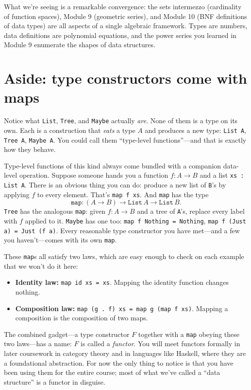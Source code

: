 \documentclass[11pt]{article}
\begin{document}
What we're seeing is a remarkable convergence: the sets intermezzo (cardinality of function spaces), Module 9 (geometric series), and Module 10 (BNF definitions of data types) are all aspects of a single algebraic framework. Types are numbers, data definitions are polynomial equations, and the power series you learned in Module 9 enumerate the shapes of data structures.

\section{Aside: type constructors come with maps}

Notice what \texttt{List}, \texttt{Tree}, and \texttt{Maybe} actually \emph{are}. None of them is a type on its own. Each is a construction that \emph{eats} a type $A$ and produces a new type: \texttt{List A}, \texttt{Tree A}, \texttt{Maybe A}. You could call them ``type-level functions''---and that is exactly how they behave.

Type-level functions of this kind always come bundled with a companion data-level operation. Suppose someone hands you a function $f : A \to B$ and a list \texttt{xs : List A}. There is an obvious thing you can do: produce a new list of \texttt{B}'s by applying $f$ to every element. That's \texttt{map~f~xs}. And \texttt{map} has the type
\[
  \texttt{map} : (A \to B) \to \texttt{List}\,A \to \texttt{List}\,B.
\]
\texttt{Tree} has the analogous \texttt{map}: given $f : A \to B$ and a tree of \texttt{A}'s, replace every label with $f$ applied to it. \texttt{Maybe} has one too: \texttt{map f Nothing = Nothing}, \texttt{map f (Just a) = Just (f a)}. Every reasonable type constructor you have met---and a few you haven't---comes with its own \texttt{map}.

These \texttt{map}s all satisfy two laws, which are easy enough to check on each example that we won't do it here:
\begin{itemize}
  \item \textbf{Identity law:} \texttt{map id xs = xs}. Mapping the identity function changes nothing.
  \item \textbf{Composition law:} \texttt{map (g . f) xs = map g (map f xs)}. Mapping a composition is the composition of two maps.
\end{itemize}

The combined gadget---a type constructor $F$ together with a \texttt{map} obeying these two laws---has a name: $F$ is called a \emph{functor}. You will meet functors formally in later coursework in category theory and in languages like Haskell, where they are a foundational abstraction. For now the only thing to notice is that you have been using them for the entire course; most of what we've called a ``data structure'' is a functor in disguise.
\end{document}
